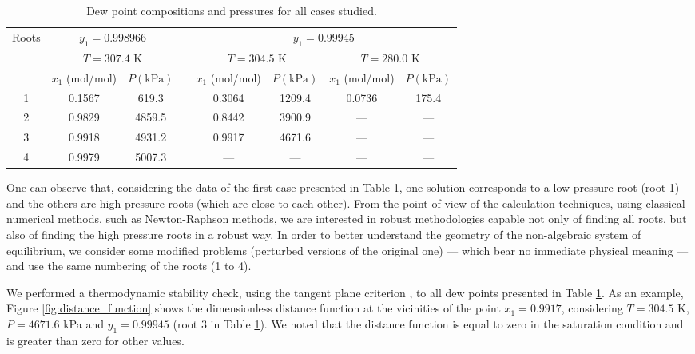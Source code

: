 \documentclass[journal=iecred,manuscript=article]{achemso}
\theoremstyle{definition}
\theoremstyle{remark}
\begin{document}
\begin{table}
\centering
\renewcommand*{\arraystretch}{1.3}
\caption{Dew point compositions and pressures for all cases studied.}
\label{tab:resultados_pontos_orvalho_pressoes}
\begin{tabular}{cccccccc}
\hline\hline
\multirow{3}{*}{Roots} & \multicolumn{2}{c}{$ y_{1} = 0.998966 $} & & \multicolumn{4}{c}{$ y_{1} = 0.99945 $} \\
 & \multicolumn{2}{c}{$ T = 307.4 $ K} & & \multicolumn{2}{c}{$ T = 304.5 $ K} & \multicolumn{2}{c}{$ T = 280.0 $ K} \\ \cline{2-3} \cline{5-8} 
 & $ x_{1} $ (mol/mol) & $ P \left( \textrm{kPa} \right) $ & & $ x_{1} $ (mol/mol) & $ P \left( \textrm{kPa} \right) $ & $ x_{1} $ (mol/mol) & $ P \left( \textrm{kPa} \right) $ \\ \hline
1 & 0.1567 & 619.3 & & 0.3064 & 1209.4 & 0.0736 & 175.4 \\
2 & 0.9829 & 4859.5 & & 0.8442 & 3900.9 & --- & --- \\
3 & 0.9918 & 4931.2 & & 0.9917 & 4671.6 & --- & --- \\
4 & 0.9979 & 5007.3 & & --- & --- & --- & --- \\ \hline\hline
\end{tabular}
\end{table}

One can observe that, considering the data of the first case presented in Table \ref{tab:resultados_pontos_orvalho_pressoes}, one solution corresponds to a low pressure root (root 1) and the others are high pressure roots (which are close to each other). From the point of view of the calculation techniques, using classical numerical methods, such as Newton-Raphson methods, we are interested in robust methodologies capable not only of finding all roots, but also of finding  the high pressure roots in a robust way. In order to better understand the geometry of the non-algebraic system of equilibrium, we consider some modified problems (perturbed versions of the original one) --- which bear no immediate physical meaning --- and use the same numbering of the roots (1 to 4).

We performed a thermodynamic stability check, using the tangent plane criterion \citep{michelsen, ngh}, to all dew points presented in Table \ref{tab:resultados_pontos_orvalho_pressoes}. As an example, Figure \ref{fig:distance_function} shows the dimensionless distance function \citep{ngh} at the vicinities of the point $ x_{1} = 0.9917 $, considering $ T = 304.5 $ K, $P = 4671.6$ kPa and $ y_{1} = 0.99945 $ (root 3 in Table \ref{tab:resultados_pontos_orvalho_pressoes}). We noted that the distance function is equal to zero in the saturation condition and is greater than zero for other values.
\end{document}
